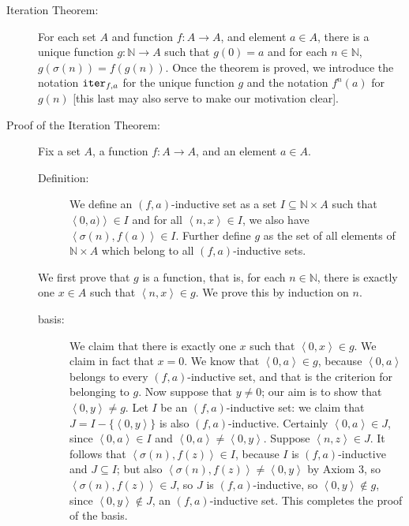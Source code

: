 \documentclass[12pt]{book}
\begin{document}
\begin{description}

\item[Iteration Theorem:]  For each set $A$ and function $f:A \rightarrow A$, and element $a \in A$, there is a unique function $g:{\mathbb N} \rightarrow A$ such that $g(0)=a$ and for each $n \in \mathbb N$, $g(\sigma(n))=f(g(n))$.  Once the theorem is proved, we introduce the notation ${\tt iter}_{f,a}$ for the unique function $g$ and the notation $f^n(a)$ for $g(n)$ [this last may also serve to make our motivation clear].

\item[Proof of the Iteration Theorem:]

Fix a set $A$, a function $f:A \rightarrow A$, and an element $a \in A$.

\begin{description}

\item[Definition:]   We define an $(f,a)$-inductive set as a set $I\subseteq {\mathbb N} \times A$ such that $\left<0,a)\right> \in I$ and for all $\left<n,x\right> \in I$, we also have $\left<\sigma(n),f(a)\right>\in I$.   Further define $g$ as the set of all elements of ${\mathbb N} \times A$ which belong to all $(f,a)$-inductive sets.

\end{description}

We first prove that $g$ is a function, that is, for each $n \in \mathbb N$, there is exactly one $x \in A$ such that $\left<n,x\right> \in g$.  We prove this by induction on $n$.

\begin{description}

\item[basis:]  We claim that there is exactly one $x$ such that $\left<0,x\right>\in g$.  We claim in fact that $x=0$.  We know that $\left<0,a\right>\in g$, because $\left<0,a\right>$ belongs to every $(f,a)$-inductive set, and that is the criterion for belonging to $g$.  Now suppose that $y \neq 0$; our aim is to show that $\left<0,y\right>\neq g$.  Let $I$ be an $(f,a)$-inductive set:  we claim that $J=I - \{\left<0,y\right>\}$ is also $(f,a)$-inductive.  Certainly $\left<0,a\right>\in J$, since $\left<0,a\right>\in I$ and
$\left<0,a\right>\neq \left<0,y\right>.$   Suppose $\left<n,z\right>\in J$.  It follows that $\left<\sigma(n),f(z)\right>\in I$, because $I$ is $(f,a)$-inductive and $J \subseteq I$; but also $\left<\sigma(n),f(z)\right>\neq \left<0,y\right>$ by Axiom 3, so $\left<\sigma(n),f(z)\right>\in J$, so $J$ is $(f,a)$-inductive, so $\left<0,y\right>\not\in g$, since $\left<0,y\right>\not\in J$, an $(f,a)$-inductive set.  This completes the proof of the basis.


\end{description}
\end{description}
\end{document}
